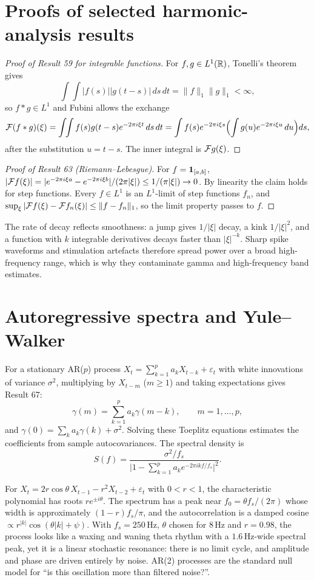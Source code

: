 \section{Proofs of selected harmonic-analysis results}
\begin{proof}[Proof of Result 59 for integrable functions]
For $f,g\in L^1(\mathbb{R})$, Tonelli's theorem gives
\[
\int\!\!\int|f(s)||g(t-s)|\,ds\,dt=\|f\|_1\|g\|_1<\infty,
\]
so $f*g\in L^1$ and Fubini allows the exchange
\[
\mathcal{F}(f*g)(\xi)=\int\!\!\int f(s)g(t-s)e^{-2\pi i\xi t}\,ds\,dt
=\int f(s)e^{-2\pi i\xi s}\Bigl(\int g(u)e^{-2\pi i\xi u}\,du\Bigr)ds,
\]
after the substitution $u=t-s$. The inner integral is $\mathcal{F} g(\xi)$.
\end{proof}
\begin{proof}[Proof of Result 63 (Riemann--Lebesgue)]
For $f=\mathbf{1}_{[a,b]}$, $|\mathcal{F} f(\xi)|=|e^{-2\pi i\xi a}-e^{-2\pi i\xi b}|/(2\pi|\xi|)\le1/(\pi|\xi|)\to0$.
By linearity the claim holds for step functions. Every $f\in L^1$ is an
$L^1$-limit of step functions $f_n$, and
$\sup_\xi|\mathcal{F} f(\xi)-\mathcal{F} f_n(\xi)|\le\|f-f_n\|_1$, so the limit
property passes to $f$.
\end{proof}
The rate of decay reflects smoothness: a jump gives $1/|\xi|$ decay, a
kink $1/|\xi|^2$, and a function with $k$ integrable derivatives decays
faster than $|\xi|^{-k}$. Sharp spike waveforms and stimulation artefacts
therefore spread power over a broad high-frequency range, which is why
they contaminate gamma and high-frequency band estimates.

\section{Autoregressive spectra and Yule--Walker}
For a stationary AR($p$) process
$X_t=\sum_{k=1}^pa_kX_{t-k}+\varepsilon_t$ with white innovations of
variance $\sigma^2$, multiplying by $X_{t-m}$ ($m\ge1$) and taking
expectations gives Result 67:
\[
\gamma(m)=\sum_{k=1}^pa_k\gamma(m-k),\qquad m=1,\ldots,p,
\]
and $\gamma(0)=\sum_ka_k\gamma(k)+\sigma^2$. Solving these Toeplitz
equations estimates the coefficients from sample autocovariances. The
spectral density is
\[
S(f)=\frac{\sigma^2/f_s}{\bigl|1-\sum_{k=1}^pa_ke^{-2\pi ikf/f_s}\bigr|^2}.
\]
\begin{example}[AR(2) resonance]
For $X_t=2r\cos\theta\,X_{t-1}-r^2X_{t-2}+\varepsilon_t$ with $0<r<1$, the
characteristic polynomial has roots $re^{\pm i\theta}$. The spectrum
has a peak near $f_0=\theta f_s/(2\pi)$ whose width is approximately
$(1-r)f_s/\pi$, and the autocorrelation is a damped cosine
$\propto r^{|k|}\cos(\theta|k|+\psi)$. With $f_s=250$\,Hz, $\theta$
chosen for $8$\,Hz and $r=0.98$, the process looks like a waxing and
waning theta rhythm with a $1.6$\,Hz-wide spectral peak, yet it is a
linear stochastic resonance: there is no limit cycle, and amplitude and
phase are driven entirely by noise. AR(2) processes are the standard
null model for ``is this oscillation more than filtered noise?''.
\end{example}

